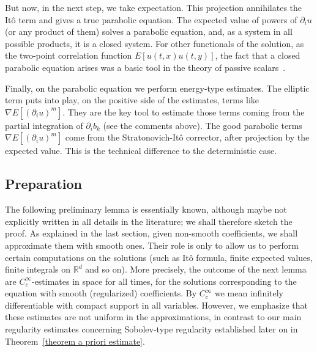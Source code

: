 \documentclass[a4paper,10pt]{article}
\begin{document}
But now, in the next step, we take expectation. This projection annihilates the
It\^{o} term and gives a true parabolic equation. The expected value of powers
of $\partial_{i}u$ (or any product of them) solves a parabolic equation, and,
as a system in all possible products, it is a closed system. For other
functionals of the solution, as the two-point correlation function $E[
u(t,x)  u(t,y)]$, the fact that a closed parabolic equation arises was a basic 
tool in the theory of passive scalars~\cite{GaKuVe}.

Finally, on the parabolic equation we perform energy-type estimates. The
elliptic term puts into play, on the positive side of the estimates, terms like
$\nabla E[ (\partial_{i}u)^{m}]$. They are the
key tool to estimate those terms coming from the partial integration of
$\partial_{i}b_{k}$ (see the comments above). The good parabolic terms
$\nabla E[(\partial_{i}u)^{m}]$ come from the Stratonovich-It\^{o} corrector, after projection by the expected value.  This is the technical difference to the deterministic case. 

\subsection{Preparation}

The following preliminary lemma is essentially known, although maybe not explicitly
written in all details in the literature; we shall therefore sketch the proof. As
explained in the last section, given non-smooth coefficients, we shall approximate
them with smooth ones. Their role is only to allow us to perform certain computations
on the solutions (such as It\^{o} formula, finite expected values, finite integrals on
$\mathbb{R}^{d}$ and so on). More precisely, the outcome of the next lemma are $C_{c}^{\infty}$-estimates in space for all times, for the solutions corresponding to the equation with smooth (regularized) coefficients. By $C_{c}^{\infty}$ we mean infinitely differentiable with compact support in all variables. However, we emphasize that these estimates are not uniform in the approximations, in contrast to our main regularity 
estimates concerning Sobolev-type regularity established later on in Theorem~\ref{theorem a priori estimate}. 
\end{document}
